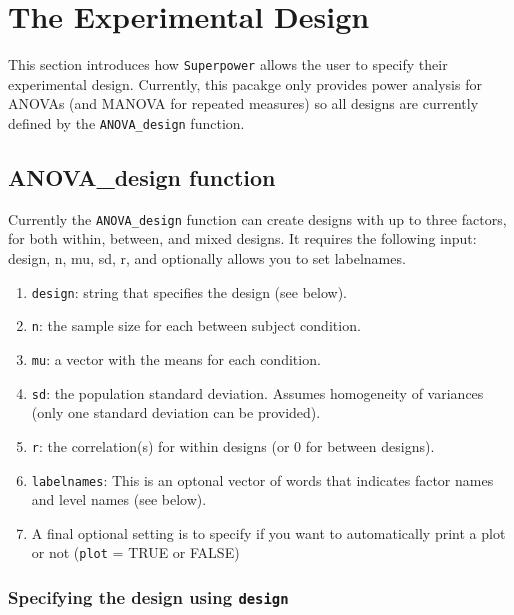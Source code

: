\documentclass[
]{book}
\providecommand{\tightlist}{%
  \setlength{\itemsep}{0pt}\setlength{\parskip}{0pt}}
\begin{document}
\hypertarget{the-experimental-design}{%
\chapter{The Experimental Design}\label{the-experimental-design}}

This section introduces how \texttt{Superpower} allows the user to specify their experimental design.
Currently, this pacakge only provides power analysis for ANOVAs (and MANOVA for repeated measures) so all designs are currently defined by the \texttt{ANOVA\_design} function.

\hypertarget{anova_design-function}{%
\section{ANOVA\_design function}\label{anova_design-function}}

Currently the \texttt{ANOVA\_design} function can create designs with up to three factors, for both within, between, and mixed designs. It requires the following input: design, n, mu, sd, r, and optionally allows you to set labelnames.

\begin{enumerate}
\def\labelenumi{\arabic{enumi}.}
\tightlist
\item
  \texttt{design}: string that specifies the design (see below).
\item
  \texttt{n}: the sample size for each between subject condition.
\item
  \texttt{mu}: a vector with the means for each condition.
\item
  \texttt{sd}: the population standard deviation. Assumes homogeneity of variances (only one standard deviation can be provided).
\item
  \texttt{r}: the correlation(s) for within designs (or 0 for between designs).
\item
  \texttt{labelnames}: This is an optonal vector of words that indicates factor names and level names (see below).
\item
  A final optional setting is to specify if you want to automatically print a plot or not (\texttt{plot} = TRUE or FALSE)
\end{enumerate}

\hypertarget{specifying-the-design-using-design}{%
\subsection{\texorpdfstring{Specifying the design using \texttt{design}}{Specifying the design using design}}\label{specifying-the-design-using-design}}
\end{document}
